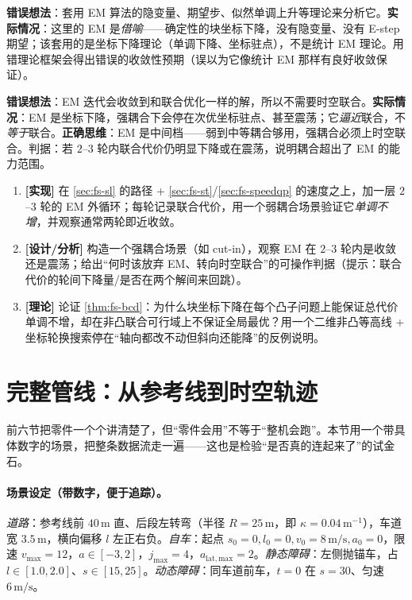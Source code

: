 \begin{pitfall}
\textbf{错误想法}：套用 EM 算法的隐变量、期望步、似然单调上升等理论来分析它。\textbf{实际情况}：这里的 EM 是\emph{借喻}——确定性的块坐标下降，没有隐变量、没有 E-step 期望；该套用的是坐标下降理论（单调下降、坐标驻点），不是统计 EM 理论。用错理论框架会得出错误的收敛性预期（误以为它像统计 EM 那样有良好收敛保证）。
\end{pitfall}

\begin{pitfall}
\textbf{错误想法}：EM 迭代会收敛到和联合优化一样的解，所以不需要时空联合。\textbf{实际情况}：EM 是坐标下降，强耦合下会停在次优坐标驻点、甚至震荡；它\emph{逼近}联合，不\emph{等于}联合。\textbf{正确思维}：EM 是中间档——弱到中等耦合够用，强耦合必须上时空联合。判据：若 $2$--$3$ 轮内联合代价仍明显下降或在震荡，说明耦合超出了 EM 的能力范围。
\end{pitfall}

\begin{practice}
\begin{enumerate}
  \item \textbf{[实现]} 在 \cref{sec:fs-sl} 的路径 + \cref{sec:fs-st}/\cref{sec:fs-speedqp} 的速度之上，加一层 $2$--$3$ 轮的 EM 外循环；每轮记录联合代价，用一个弱耦合场景验证它\emph{单调不增}，并观察通常两轮即近收敛。
  \item \textbf{[设计/分析]} 构造一个强耦合场景（如 cut-in），观察 EM 在 $2$--$3$ 轮内是收敛还是震荡；给出“何时该放弃 EM、转向时空联合”的可操作判据（提示：联合代价的轮间下降量/是否在两个解间来回跳）。
  \item \textbf{[理论]} 论证 \cref{thm:fs-bcd}：为什么块坐标下降在每个凸子问题上能保证总代价单调不增，却在非凸联合可行域上不保证全局最优？用一个二维非凸等高线 + 坐标轮换搜索停在“轴向都改不动但斜向还能降”的反例说明。
\end{enumerate}
\end{practice}

\section{完整管线：从参考线到时空轨迹}
\label{sec:fs-pipeline}

前六节把零件一个个讲清楚了，但“零件会用”不等于“整机会跑”。本节用一个带具体数字的场景，把整条数据流走一遍——这也是检验“是否真的连起来了”的试金石。

\paragraph{场景设定（带数字，便于追踪）。}
\emph{道路}：参考线前 $40\,\mathrm{m}$ 直、后段左转弯（半径 $R=25\,\mathrm{m}$，即 $\kappa=0.04\,\mathrm{m}^{-1}$），车道宽 $3.5\,\mathrm{m}$，横向偏移 $l$ 左正右负。\emph{自车}：起点 $s_0=0,l_0=0,v_0=8\,\mathrm{m/s},a_0=0$，限速 $v_{\max}=12$，$a\in[-3,2]$，$j_{\max}=4$，$a_{\mathrm{lat,max}}=2$。\emph{静态障碍}：左侧抛锚车，占 $l\in[1.0,2.0]$、$s\in[15,25]$。\emph{动态障碍}：同车道前车，$t=0$ 在 $s=30$、匀速 $6\,\mathrm{m/s}$。

